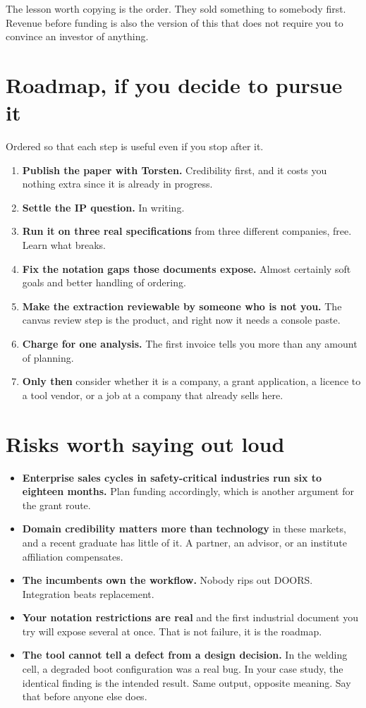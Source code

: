 \documentclass[11pt,a4paper]{article}
\begin{document}
The lesson worth copying is the order. They sold something to somebody first. Revenue
before funding is also the version of this that does not require you to convince an
investor of anything.

\section{Roadmap, if you decide to pursue it}

Ordered so that each step is useful even if you stop after it.

\begin{enumerate}
\item \textbf{Publish the paper with Torsten.} Credibility first, and it costs you
      nothing extra since it is already in progress.
\item \textbf{Settle the IP question.} In writing.
\item \textbf{Run it on three real specifications} from three different companies, free.
      Learn what breaks.
\item \textbf{Fix the notation gaps those documents expose.} Almost certainly soft goals
      and better handling of ordering.
\item \textbf{Make the extraction reviewable by someone who is not you.} The canvas
      review step is the product, and right now it needs a console paste.
\item \textbf{Charge for one analysis.} The first invoice tells you more than any amount
      of planning.
\item \textbf{Only then} consider whether it is a company, a grant application, a
      licence to a tool vendor, or a job at a company that already sells here.
\end{enumerate}

\section{Risks worth saying out loud}

\begin{itemize}
\item \textbf{Enterprise sales cycles in safety-critical industries run six to eighteen
      months.} Plan funding accordingly, which is another argument for the grant route.
\item \textbf{Domain credibility matters more than technology} in these markets, and a
      recent graduate has little of it. A partner, an advisor, or an institute
      affiliation compensates.
\item \textbf{The incumbents own the workflow.} Nobody rips out DOORS. Integration beats
      replacement.
\item \textbf{Your notation restrictions are real} and the first industrial document you
      try will expose several at once. That is not failure, it is the roadmap.
\item \textbf{The tool cannot tell a defect from a design decision.} In the welding cell,
      a degraded boot configuration was a real bug. In your case study, the identical
      finding is the intended result. Same output, opposite meaning. Say that before
      anyone else does.
\end{itemize}
\end{document}
